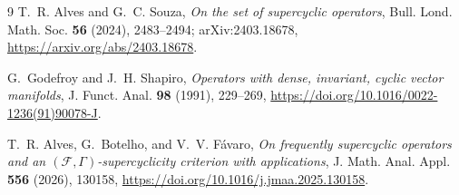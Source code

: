 \documentclass[11pt]{article}
\begin{document}
\begin{thebibliography}{9}
T.~R. Alves and G.~C. Souza,
\emph{On the set of supercyclic operators},
Bull. Lond. Math. Soc. \textbf{56} (2024), 2483--2494;
arXiv:2403.18678,
\url{https://arxiv.org/abs/2403.18678}.

G.~Godefroy and J.~H. Shapiro,
\emph{Operators with dense, invariant, cyclic vector manifolds},
J. Funct. Anal. \textbf{98} (1991), 229--269,
\url{https://doi.org/10.1016/0022-1236(91)90078-J}.

T.~R. Alves, G.~Botelho, and V.~V. F\'{a}varo,
\emph{On frequently supercyclic operators and an
$(\mathcal F,\Gamma)$-supercyclicity criterion with applications},
J. Math. Anal. Appl. \textbf{556} (2026), 130158,
\url{https://doi.org/10.1016/j.jmaa.2025.130158}.
\end{thebibliography}
\end{document}
